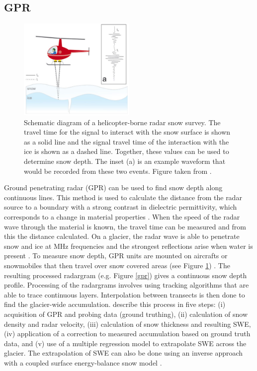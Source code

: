 \documentclass{sfuthesis}
\begin{document}
\subsection{GPR}
\label{sec:GPR}
\begin{figure}
 \centering
      \includegraphics[width=0.5\textwidth]{gpr_air.png}
  \caption{Schematic diagram of a helicopter-borne radar snow survey. The travel time for the signal to interact with the snow surface is shown as a solid line and the signal travel time of the interaction with the ice is shown as a dashed line. Together, these values can be used to determine snow depth. The inset (a) is an example waveform that would be recorded from these two events. Figure taken from \cite{Gusmeroli2014}.}
        \label{gprair}
\end{figure}

Ground penetrating radar (GPR) can be used to find snow depth along continuous lines. This method is used to calculate the distance from the radar source to a boundary with a strong contrast in dielectric permittivity, which corresponds to a change in material properties \citep{Sold2013}. When the speed of the radar wave through the material is known, the travel time can be measured and from this the distance calculated. On a glacier, the radar wave is able to penetrate snow and ice at MHz frequencies and the strongest reflections arise when water is present \citep{Sold2013}. To measure snow depth, GPR units are mounted on aircrafts or snowmobiles that then travel over snow covered areas (see Figure \ref{gprair}) \citep{Machguth2006, McGrath2015}. The resulting processed radargram (e.g. Figure \ref{gpr}) gives a continuous snow depth profile. Processing of the radargrams involves using tracking algorithms that are able to trace continuous layers. Interpolation between transects is then done to find the glacier-wide accumulation. \cite{McGrath2015} describe this process in five steps: (i) acquisition of GPR and probing data (ground truthing), (ii) calculation of snow density and radar velocity, (iii) calculation of snow thickness and resulting SWE, (iv) application of a correction to measured accumulation based on ground truth data, and (v) use of a multiple regression model to extrapolate SWE across the glacier. The extrapolation of SWE can also be done using an inverse approach with a coupled surface energy-balance snow model \citep{Pelt2014}.
\end{document}
